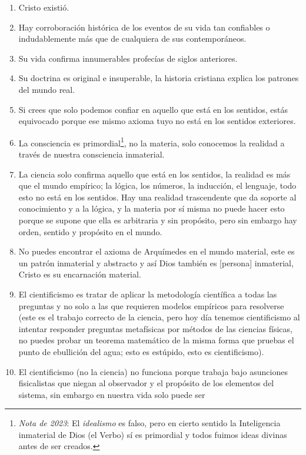 \documentclass[12pt]{article}
\begin{document}
	\begin{enumerate}
		\item Cristo existió.
		\item Hay corroboración histórica de los eventos de su
	vida tan confiables o indudablemente más que de cualquiera de sus
	contemporáneos.
	\item Su vida confirma innumerables profecías de siglos
	anteriores.
	\item Su doctrina es original e insuperable, la historia
	cristiana explica los patrones del mundo real.
	\item Si crees que solo podemos confiar en aquello que está en los
	sentidos, estás equivocado porque ese mismo axioma tuyo no está en los
	sentidos exteriores.
\item La consciencia es primordial\footnote{\textit{Nota de 2023}: El
	\textit{idealismo} es falso, pero en
			cierto sentido la Inteligencia inmaterial de Dios (el
			Verbo) sí es primordial y todos fuimos
			ideas divinas antes de ser creados.}, no la materia,
			solo conocemos la
	realidad a través de nuestra consciencia inmaterial.
	\item La ciencia solo confirma aquello que está en los sentidos, la
	realidad es más que el mundo empírico; la lógica, los números, la
	inducción, el lenguaje, todo esto no está en los sentidos. Hay una
	realidad trascendente que da soporte al conocimiento y a la lógica, y la
	materia por sí misma no puede hacer esto porque se supone que ella es
	arbitraria y sin propósito, pero sin embargo hay orden, sentido y
	propósito en el mundo.
	\item No puedes encontrar el axioma de Arquímedes en el mundo
	material, este es un patrón inmaterial y abstracto y así Dios también es
	[persona] inmaterial, Cristo es su encarnación material.
	\item El cientificismo es tratar de aplicar la metodología científica a
	todas las preguntas y no solo a las que requieren modelos empíricos para
	resolverse (este es el trabajo correcto de la ciencia, pero hoy día
	tenemos cientificismo al intentar responder preguntas metafísicas por
	métodos de las ciencias físicas, no puedes probar un teorema matemático
	de la misma forma que pruebas el punto de ebullición del agua; esto es
	estúpido, esto es cientificismo).
	\item El cientificismo (no la ciencia) no funciona porque trabaja bajo
	asunciones fisicalistas que niegan al observador y el propósito de los
	elementos del sistema, sin embargo en nuestra vida solo puede ser

\end{enumerate}
\end{document}
